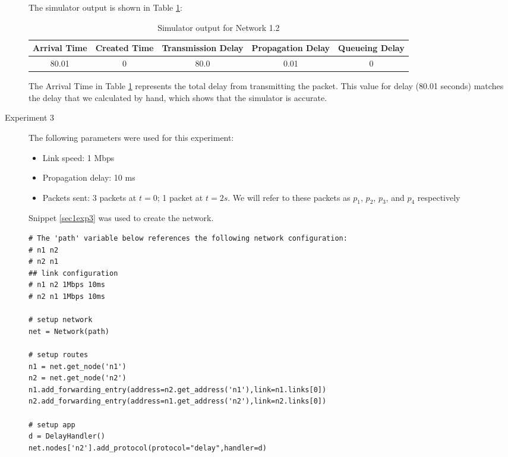 \documentclass[11pt]{article}
\begin{document}
\begin{description}
The simulator output is shown in Table \ref{tbl1.2}:

\smallskip

\begin{table}[H]
\begin{center}
\caption{Simulator output for Network 1.2}
\label{tbl1.2}
\begin{tabular}{ccccc}
  \toprule
  Arrival Time & Created Time & Transmission Delay & Propagation Delay & Queueing Delay\\
  \midrule
  80.01 & 0 & 80.0 & 0.01 & 0\\
  \bottomrule
\end{tabular}
\end{center}
\end{table}

\smallskip

The Arrival Time in Table \ref{tbl1.2} represents the total delay from transmitting the packet. This value for delay (80.01 seconds) matches the delay that we calculated by hand, which shows that the simulator is accurate.

\item[Experiment 3] \hfill \break
The following parameters were used for this experiment:

\begin{itemize}
\item Link speed: 1 Mbps
\item Propagation delay: 10 ms
\item Packets sent: 3 packets at $t = 0$; 1 packet at $t = 2s$. We will refer to these packets as $p_1$, $p_2$, $p_3$, and $p_4$ respectively
\end{itemize}

\medskip

Snippet \ref{sec1exp3} was used to create the network.

\medskip

\begin{lstlisting}[caption={Network 1.3},label=sec1exp3]
# The 'path' variable below references the following network configuration:
# n1 n2
# n2 n1
## link configuration
# n1 n2 1Mbps 10ms
# n2 n1 1Mbps 10ms

# setup network
net = Network(path)

# setup routes
n1 = net.get_node('n1')
n2 = net.get_node('n2')
n1.add_forwarding_entry(address=n2.get_address('n1'),link=n1.links[0])
n2.add_forwarding_entry(address=n1.get_address('n2'),link=n2.links[0])

# setup app
d = DelayHandler()
net.nodes['n2'].add_protocol(protocol="delay",handler=d)


\end{lstlisting}
\end{description}
\end{document}
